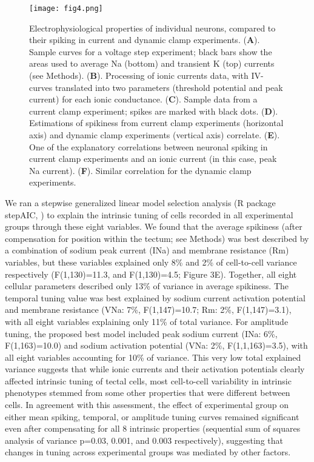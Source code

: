 \documentclass{article}
\begin{document}
\begin{figure}[!t]
\centering
\texttt{[image: fig4.png]}
\caption{Electrophysiological properties of individual neurons, compared to their spiking in current and dynamic clamp experiments. (\textbf{A}). Sample curves for a voltage step experiment; black bars show the areas used to average Na (bottom) and transient K (top) currents (see Methods). (\textbf{B}). Processing of ionic currents data, with IV-curves translated into two parameters (threshold potential and peak current) for each ionic conductance. (\textbf{C}). Sample data from a current clamp experiment; spikes are marked with black dots. (\textbf{D}). Estimations of spikiness from current clamp experiments (horizontal axis) and dynamic clamp experiments (vertical axis) correlate. (\textbf{E}). One of the explanatory correlations between neuronal spiking in current clamp experiments and an ionic current (in this case, peak Na current). (\textbf{F}). Similar correlation for the dynamic clamp experiments.}
\end{figure}

We ran a stepwise generalized linear model selection analysis (R package stepAIC, \citealt{venables2013}) to explain the intrinsic tuning of cells recorded in all experimental groups through these eight variables. We found that the average spikiness (after compensation for position within the tectum; see Methods) was best described by a combination of sodium peak current (INa) and membrane resistance (Rm) variables, but these variables explained only 8\% and 2\% of cell-to-cell variance respectively (F(1,130)=11.3, and F(1,130)=4.5; Figure 3E). Together, all eight cellular parameters described only 13\% of variance in average spikiness. The temporal tuning value was best explained by sodium current activation potential and membrane resistance (VNa: 7\%, F(1,147)=10.7; Rm: 2\%, F(1,147)=3.1), with all eight variables explaining only 11\% of total variance. For amplitude tuning, the proposed best model included peak sodium current (INa: 6\%, F(1,163)=10.0) and sodium activation potential (VNa: 2\%, F(1,1,163)=3.5), with all eight variables accounting for 10\% of variance. This very low total explained variance suggests that while ionic currents and their activation potentials clearly affected intrinsic tuning of tectal cells, most cell-to-cell variability in intrinsic phenotypes stemmed from some other properties that were different between cells. In agreement with this assessment, the effect of experimental group on either mean spiking, temporal, or amplitude tuning curves remained significant even after compensating for all 8 intrinsic properties (sequential sum of squares analysis of variance p=0.03, 0.001, and 0.003 respectively), suggesting that changes in tuning across experimental groups was mediated by other factors.
\end{document}
